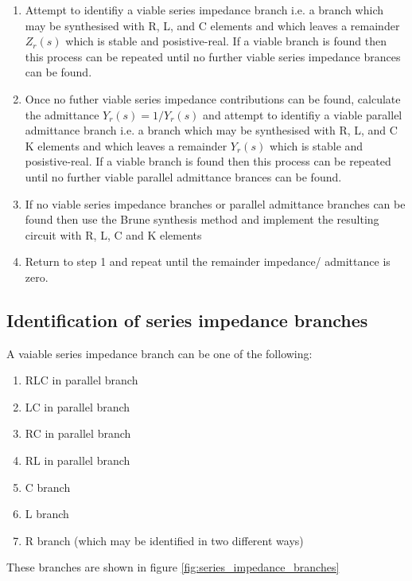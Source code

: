 \begin{enumerate}
\item Attempt to identifiy a viable series impedance branch i.e. a branch which may be synthesised with R, L, and C elements and which leaves a remainder $Z_r(s)$ which is stable and posistive-real. If a viable branch is found then this process can be repeated until no further viable series impedance brances can be found.
\item Once no futher viable series impedance contributions can be found, calculate the admittance $Y_r(s)=1/Y_r(s)$ and attempt to identifiy a viable parallel admittance branch i.e. a branch which may be synthesised with R, L, and C K elements and which leaves a remainder $Y_r(s)$ which is stable and posistive-real. If a viable branch is found then this process can be repeated until no further viable parallel admittance brances can be found.
\item If no viable series impedance branches or parallel admittance branches can be found then use the Brune synthesis method and implement the resulting circuit with R, L, C and K elements
\item Return to step 1 and repeat until the remainder impedance/ admittance is zero.
\end{enumerate}

\subsection{Identification of series impedance branches} 
A vaiable series impedance branch can be one of the following:

\begin{enumerate}
\item  RLC in parallel branch
\item  LC in parallel branch
\item  RC in parallel branch
\item  RL in parallel branch
\item  C branch
\item  L branch
\item  R branch (which may be identified in two different ways)
\end{enumerate}

These branches are shown in figure \ref{fig:series_impedance_branches}

